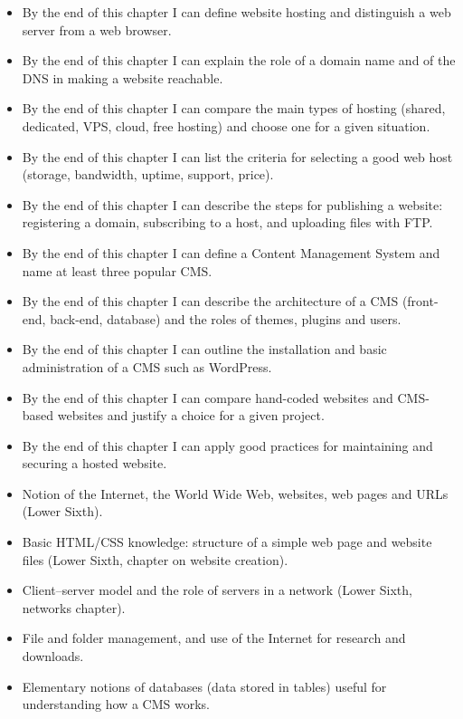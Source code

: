 \documentclass[11pt]{article}
\begin{document}
\begin{objectifs}
\begin{itemize}
\item By the end of this chapter I can define website hosting and distinguish a web server from a web browser.
\item By the end of this chapter I can explain the role of a domain name and of the DNS in making a website reachable.
\item By the end of this chapter I can compare the main types of hosting (shared, dedicated, VPS, cloud, free hosting) and choose one for a given situation.
\item By the end of this chapter I can list the criteria for selecting a good web host (storage, bandwidth, uptime, support, price).
\item By the end of this chapter I can describe the steps for publishing a website: registering a domain, subscribing to a host, and uploading files with FTP.
\item By the end of this chapter I can define a Content Management System and name at least three popular CMS.
\item By the end of this chapter I can describe the architecture of a CMS (front-end, back-end, database) and the roles of themes, plugins and users.
\item By the end of this chapter I can outline the installation and basic administration of a CMS such as WordPress.
\item By the end of this chapter I can compare hand-coded websites and CMS-based websites and justify a choice for a given project.
\item By the end of this chapter I can apply good practices for maintaining and securing a hosted website.
\end{itemize}
\end{objectifs}

\begin{prerequis}
\begin{itemize}
\item Notion of the Internet, the World Wide Web, websites, web pages and URLs (Lower Sixth).
\item Basic HTML/CSS knowledge: structure of a simple web page and website files (Lower Sixth, chapter on website creation).
\item Client–server model and the role of servers in a network (Lower Sixth, networks chapter).
\item File and folder management, and use of the Internet for research and downloads.
\item Elementary notions of databases (data stored in tables) useful for understanding how a CMS works.
\end{itemize}
\end{prerequis}
\end{document}
